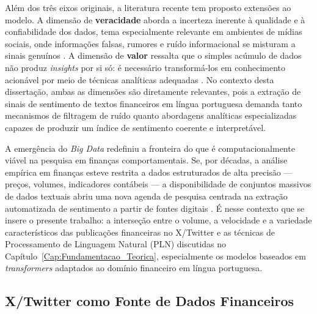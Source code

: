 Além dos três eixos originais, a literatura recente tem proposto extensões ao modelo. A dimensão de \textbf{veracidade} aborda a incerteza inerente à qualidade e à confiabilidade dos dados, tema especialmente relevante em ambientes de mídias sociais, onde informações falsas, rumores e ruído informacional se misturam a sinais genuínos \cite{chen2014bigdata}. A dimensão de \textbf{valor} ressalta que o simples acúmulo de dados não produz \textit{insights} por si só: é necessário transformá-los em conhecimento acionável por meio de técnicas analíticas adequadas \cite{mayer2013}. No contexto desta dissertação, ambas as dimensões são diretamente relevantes, pois a extração de sinais de sentimento de textos financeiros em língua portuguesa demanda tanto mecanismos de filtragem de ruído quanto abordagens analíticas especializadas capazes de produzir um índice de sentimento coerente e interpretável.

A emergência do \textit{Big Data} redefiniu a fronteira do que é computacionalmente viável na pesquisa em finanças comportamentais. Se, por décadas, a análise empírica em finanças esteve restrita a dados estruturados de alta precisão --- preços, volumes, indicadores contábeis --- a disponibilidade de conjuntos massivos de dados textuais abriu uma nova agenda de pesquisa centrada na extração automatizada de sentimento a partir de fontes digitais \cite{kearney2014,antweiler2004}. É nesse contexto que se insere o presente trabalho: a interseção entre o volume, a velocidade e a variedade característicos das publicações financeiras no X/Twitter e as técnicas de Processamento de Linguagem Natural (PLN) discutidas no Capítulo~\ref{Cap:Fundamentacao_Teorica}, especialmente os modelos baseados em \textit{transformers} adaptados ao domínio financeiro em língua portuguesa.


\subsection{X/Twitter como Fonte de Dados Financeiros}
\label{subsec:twitter_dados_financeiros}

